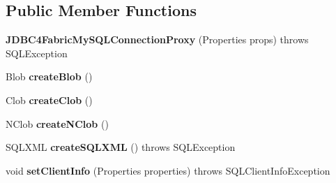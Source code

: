 \subsection*{Public Member Functions}
\begin{DoxyCompactItemize}
\item 
\mbox{\label{classcom_1_1mysql_1_1fabric_1_1jdbc_1_1_j_d_b_c4_fabric_my_s_q_l_connection_proxy_a049987997a588c3171410441ce6022c6}} 
{\bfseries J\+D\+B\+C4\+Fabric\+My\+S\+Q\+L\+Connection\+Proxy} (Properties props)  throws S\+Q\+L\+Exception 
\item 
\mbox{\label{classcom_1_1mysql_1_1fabric_1_1jdbc_1_1_j_d_b_c4_fabric_my_s_q_l_connection_proxy_ac730f0e106a59d5d4c764f4b0b2f0b32}} 
Blob {\bfseries create\+Blob} ()
\item 
\mbox{\label{classcom_1_1mysql_1_1fabric_1_1jdbc_1_1_j_d_b_c4_fabric_my_s_q_l_connection_proxy_a27229674d8d6d5ae82e3587a8ecd8a98}} 
Clob {\bfseries create\+Clob} ()
\item 
\mbox{\label{classcom_1_1mysql_1_1fabric_1_1jdbc_1_1_j_d_b_c4_fabric_my_s_q_l_connection_proxy_ae575f431cffc3c83daa21eb638b0a5b9}} 
N\+Clob {\bfseries create\+N\+Clob} ()
\item 
\mbox{\label{classcom_1_1mysql_1_1fabric_1_1jdbc_1_1_j_d_b_c4_fabric_my_s_q_l_connection_proxy_a19d02308b67abd17d84c674cfcb55e69}} 
S\+Q\+L\+X\+ML {\bfseries create\+S\+Q\+L\+X\+ML} ()  throws S\+Q\+L\+Exception 
\item 
\mbox{\label{classcom_1_1mysql_1_1fabric_1_1jdbc_1_1_j_d_b_c4_fabric_my_s_q_l_connection_proxy_afc186caa91b79a3cdb46c57a3dce9d35}} 
void {\bfseries set\+Client\+Info} (Properties properties)  throws S\+Q\+L\+Client\+Info\+Exception 
\item 
\mbox{\label{classcom_1_1mysql_1_1fabric_1_1jdbc_1_1_j_d_b_c4_fabric_my_s_q_l_connection_proxy_ae05800032980ac26fa78e4097bc750bf}} 

\end{DoxyCompactItemize}
